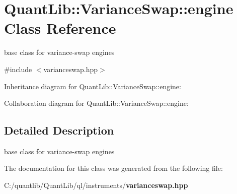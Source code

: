 \section{Quant\+Lib\+:\+:Variance\+Swap\+:\+:engine Class Reference}
\label{class_quant_lib_1_1_variance_swap_1_1engine}


base class for variance-\/swap engines  




{\ttfamily \#include $<$varianceswap.\+hpp$>$}



Inheritance diagram for Quant\+Lib\+:\+:Variance\+Swap\+:\+:engine\+:


Collaboration diagram for Quant\+Lib\+:\+:Variance\+Swap\+:\+:engine\+:


\subsection{Detailed Description}
base class for variance-\/swap engines 

The documentation for this class was generated from the following file\+:\begin{DoxyCompactItemize}
\item 
C\+:/quantlib/\+Quant\+Lib/ql/instruments/{\bf varianceswap.\+hpp}\end{DoxyCompactItemize}
